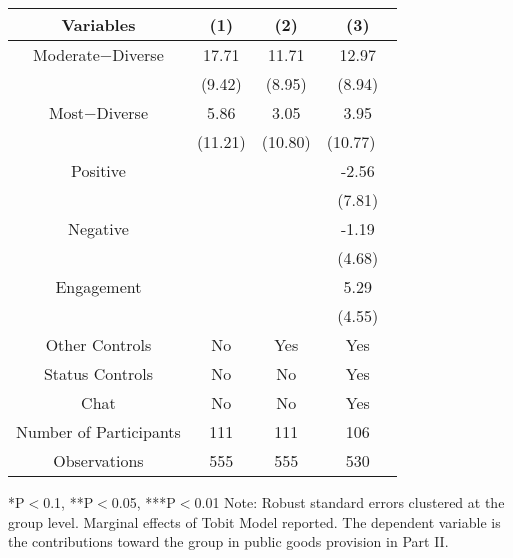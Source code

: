 \begin{table}[htbp]
    \begin{tabular}{c c c c}
    \toprule
    \textbf{Variables} & \textbf{(1)} & \textbf{(2)} & \textbf{(3)}     \\ 
\midrule
Moderate$-$Diverse  &  17.71\sym{*} &  11.71            &  12.97     \\
                    &  (9.42)       &  (8.95)           &  (8.94)    \\
\addlinespace
Most$-$Diverse      &  5.86       &   3.05                &  3.95     \\
                    &  (11.21)      & (10.80)             &  (10.77)     \ \\

\addlinespace
Positive                 &           &                     &  -2.56     \\
                         &           &                     &  (7.81)   \\
\addlinespace
Negative                 &           &                      &  -1.19  \\
                          &          &                      &  (4.68)    \\
\addlinespace
Engagement               &          &                        & 5.29    \\
                         &          &                          &  (4.55)   \\

\midrule
Other Controls   &   No &  Yes &    Yes    \\
Status Controls &   No  &    No    &    Yes    \\
Chat          &    No    &    No   &    Yes          \\
\midrule
Number of Participants & 111   &    111 &    106    \\
\midrule
Observations          &   555   &  555  &  530         \\
\bottomrule

\end{tabular}
\begin{footnotesize}
\newline
*P$<$0.1, **P$<$0.05, ***P$<$0.01
\newline
Note: Robust standard errors clustered at the group level. Marginal effects of Tobit Model reported. 
\newline
The dependent variable is the contributions toward the group in public goods provision in Part II.
\end{footnotesize}
\end{table}
